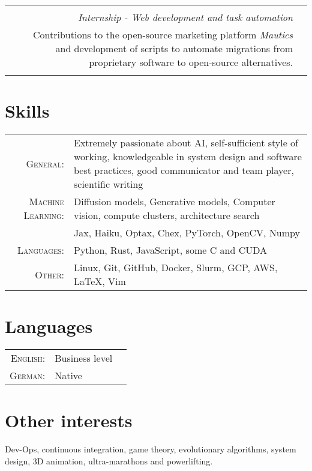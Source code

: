 \documentclass[11pt]{article}
\newcommand{\tabitem}{{\textbullet}~}
\begin{document}
\begin{tabular}{r|l}
    \begin{tabularx}{0.8\textwidth}{X}
        \textsc{Padberg \& Partners} \\

        \emph{Internship - Web development and task automation} \\

        \tabitem Contributions to the open-source marketing platform
        \textit{Mautics} and development of scripts to automate migrations from
        proprietary software to open-source alternatives. \\

    \end{tabularx}

\end{tabular}

\section{Skills}

\begin{tabularx}{\textwidth}{rX}
    \textsc{General:} & Extremely passionate about AI,
                        self-sufficient style of working,
                        knowledgeable in system design and software best practices,
                        good communicator and team player,
                        scientific writing \\
    \textsc{Machine Learning:} & Diffusion models,
                                 Generative models,
                                 Computer vision,
                                 compute clusters,
                                 architecture search \\
                               & Jax, Haiku, Optax, Chex, PyTorch, OpenCV, Numpy \\
    \textsc{Languages:} & Python, Rust, JavaScript, some C and CUDA \\
    \textsc{Other:} & Linux, Git, GitHub, Docker, Slurm, GCP, AWS, LaTeX, Vim \\
\end{tabularx}

\section{Languages}

\begin{tabularx}{\textwidth}{rlX}
    \textsc{English:} & Business level & \\
    \textsc{German:}  & Native & \\
\end{tabularx}

\section{Other interests}
Dev-Ops, continuous integration, game theory, evolutionary algorithms, system
design, 3D animation, ultra-marathons and powerlifting.
\end{document}
